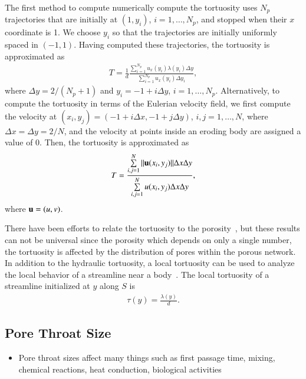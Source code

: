 \documentclass[preprint, 10pt]{elsarticle}
\begin{document}
The first method to compute numerically compute the tortuosity uses
$N_p$ trajectories that are initially at $(1,y_i)$, $i=1,\ldots,N_p$,
and stopped when their $x$ coordinate is 1.  We choose $y_i$ so that the
trajectories are initially uniformly spaced in $(-1,1)$.  Having
computed these trajectories, the tortuosity is approximated as
\begin{align}
  T = \frac{1}{d}\frac{\displaystyle\sum_{i=1}^{N_p} 
    u_x(y_i) \lambda(y_i) \Delta y}
  {\displaystyle\sum_{i=1}^{N_p} u_x(y_i) \Delta y_i}, 
\end{align}
where $\Delta y = 2/(N_p + 1)$ and $y_i = -1 + i \Delta y$,
$i=1,\ldots,N_p$.  Alternatively, to compute the tortuosity in terms of
the Eulerian velocity field, we first compute the velocity at $(x_i,y_j)
= (-1 + i\Delta x, -1 + j\Delta y)$, $i,j=1,\ldots,N$, where $\Delta x =
\Delta y = 2/N$, and the velocity at points inside an eroding body are
assigned a value of 0.  Then, the tortuosity is approximated as
\begin{align}
  T = \frac{\sum\limits_{i,j=1}^N \|{\mathbf{u}}(x_i,y_j)\|\Delta x \Delta y}
      {\sum\limits_{i,j=1}^N u(x_i,y_j) \Delta x \Delta y},
\end{align}
where ${\mathbf{u}} = (u,v)$.

There have been efforts to relate the tortuosity to the
porosity~\cite{matyka2008tortuosity}, but these results can not be
universal since the porosity which depends on only a single number, the
tortuosity is affected by the distribution of pores within the porous
network.  In addition to the hydraulic tortuosity, a local tortuosity
can be used to analyze the local behavior of a streamline near a
body~\cite{matyka2008tortuosity}.  The local tortuosity of a streamline
initialized at $y$ along $S$ is
\begin{align}
  \tau(y) = \frac{\lambda(y)}{d}.
  \label{eqn:localTort}
\end{align}


\subsection{Pore Throat Size}
\begin{itemize}
  \item Pore throat sizes affect many things such as first passage time,
  mixing, chemical reactions, heat conduction, biological activities
\end{itemize}
\end{document}
